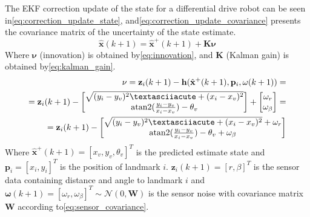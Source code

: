 The EKF correction update of the state for a differential drive robot can be seen in\:\eqref{eq:correction_update_state}, and\:\eqref{eq:correction_update_covariance} presents the covariance matrix of the uncertainty of the state estimate\:\cite{corke_robotics_2023}.
\begin{equation}
    \label{eq:correction_update_state}
    \hat{\mathbf{x}}(k+1) = \hat{\mathbf{x}}^+(k+1) + \mathbf{K} \mathbf{\nu}
\end{equation}
Where $\mathbf{\nu}$ (innovation) is obtained by\:\eqref{eq:innovation}, and $\mathbf{K}$ (Kalman gain) is obtained by\:\eqref{eq:kalman_gain}\:\cite{corke_robotics_2023}.
\begin{equation}
    \label{eq:innovation}
    \begin{split}
        \mathbf{\nu} = \mathbf{z}_i (k+1) - \mathbf{h} (\hat{\mathbf{x}}^+(k+1), \mathbf{p}_i, \mathbf{\omega} (k+1)) = \\
        = \mathbf{z}_i (k+1) -
        \begin{bmatrix}
            \sqrt{(y_i - y_v)^2 ´+ (x_i - x_v)^2} \\
            \atantwo(\frac{y_i-y_v}{x_i-x_v}) - \theta_v
        \end{bmatrix}
        +
        \begin{bmatrix}
            \omega_r \\
            \omega_{\beta}
        \end{bmatrix}
        = \\
        = \mathbf{z}_i (k+1) - 
        \begin{bmatrix}
            \sqrt{(y_i - y_v)^2 ´+ (x_i - x_v)^2} + \omega_r \\
            \atantwo(\frac{y_i-y_v}{x_i-x_v}) - \theta_v + \omega_{\beta}
        \end{bmatrix}
    \end{split}
\end{equation}
Where $\hat{\mathbf{x}}^+(k+1) = [x_v, y_v, \theta_v]^T$ is the predicted estimate state and $\mathbf{p}_i = [x_i, y_i]^T$ is the position of landmark $i$\:\cite{corke_robotics_2023}.
$\mathbf{z}_i (k+1) = [r, \beta]^T$ is the sensor data containing distance and angle to landmark $i$ and $\mathbf{\omega} (k+1) = [\omega_r, \omega_{\beta}]^T \sim \mathcal{N}(0, \mathbf{W})$ is the sensor noise with covariance matrix $\mathbf{W}$ according to\:\eqref{eq:sensor_covariance}\:\cite{corke_robotics_2023}.
